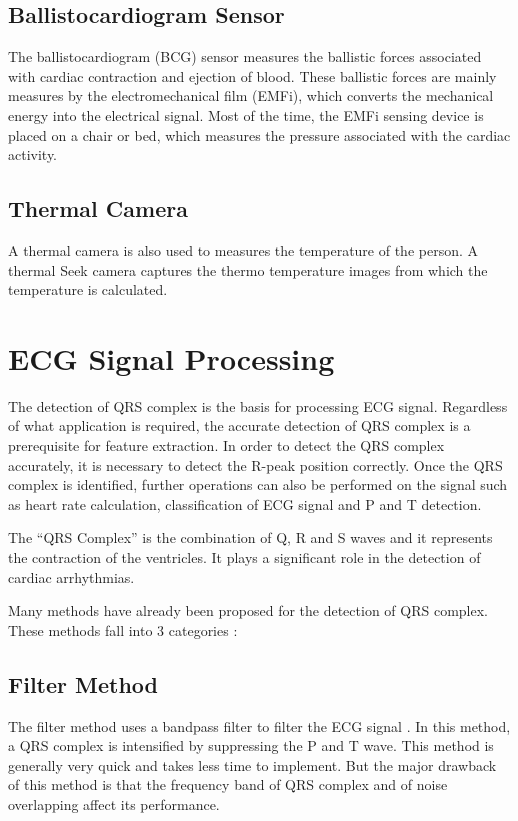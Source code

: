 \subsection{Ballistocardiogram Sensor}
The ballistocardiogram (BCG) sensor measures the ballistic forces associated with cardiac contraction and ejection of blood. These ballistic forces are mainly measures by the electromechanical film (EMFi), which converts the mechanical energy into the electrical signal. Most of the time, the EMFi sensing device is placed on a chair or bed, which measures the pressure associated with the cardiac activity.

\subsection{Thermal Camera}
A thermal camera is also used to measures the temperature of the person. A thermal Seek camera captures the thermo temperature images from which the temperature is calculated.

\section{ECG Signal Processing}
The detection of QRS complex is the basis for processing ECG signal. Regardless of what application is required, the accurate detection of QRS complex is a prerequisite for feature extraction. In order to detect the QRS complex accurately, it is necessary to detect the R-peak position correctly. Once the QRS complex is identified, further operations can also be performed on the signal such as heart rate calculation, classification of ECG signal and P and T detection.

The ``QRS Complex'' is the combination of Q, R and S waves and it represents the contraction of the ventricles. It plays a significant role in the detection of cardiac arrhythmias.

Many methods have already been proposed for the detection of QRS complex. These methods fall into 3 categories \cite{5639905}:

\subsection{Filter Method}
The filter method uses a bandpass filter to filter the ECG signal \cite{4122029}\cite{554762}. In this method, a QRS complex is intensified by suppressing the P and T wave. This method is generally very quick and takes less time to implement. But the major drawback of this method is that the frequency band of QRS complex and of noise overlapping affect its performance.

